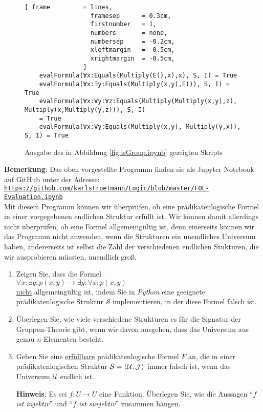 \begin{figure}[!ht]
\centering
\begin{Verbatim}[ frame         = lines, 
                  framesep      = 0.3cm, 
                  firstnumber   = 1,
                  numbers       = none,
                  numbersep     = -0.2cm,
                  xleftmargin   = -0.5cm,
                  xrightmargin  = -0.5cm,
                ]
    evalFormula(∀x:Equals(Multiply(E(),x),x), S, I) = True
    evalFormula(∀x:∃y:Equals(Multiply(x,y),E()), S, I) = True
    evalFormula(∀x:∀y:∀z:Equals(Multiply(Multiply(x,y),z), Multiply(x,Multiply(y,z))), S, I)
    = True
    evalFormula(∀x:∀y:Equals(Multiply(x,y), Multiply(y,x)), S, I) = True
\end{Verbatim}
\vspace*{-0.3cm}
\caption{Ausgabe des in Abbildung \ref{fig:isGroup.ipynb} gezeigten Skripts}
\label{fig:isGroup.out}
\end{figure}

\noindent
\textbf{Bemerkung}:  Das oben vorgestellte Programm finden sie als Jupyter Notebook auf GitHub unter der Adresse:
\\[0.2cm]
\hspace*{0.8cm}
\href{https://github.com/karlstroetmann/Logic/blob/master/Python/FOL-Evaluation.ipynb}{\texttt{https://github.com/karlstroetmann/Logic/blob/master/FOL-Evaluation.ipynb}}
\\[0.2cm]
Mit diesem Programm können wir überprüfen, ob eine
prädikatenlogische Formel in einer vorgegebenen endlichen Struktur erfüllt ist. Wir können damit
allerdings nicht überprüfen, ob eine Formel allgemeingültig ist, denn einerseits können
wir das Programm nicht anwenden, wenn die Strukturen ein unendliches Universum haben,
andererseits ist selbst die Zahl der verschiedenen endlichen Stukturen, die wir ausprobieren
müssten, unendlich groß.  \eox

\exercise
\begin{enumerate}
\item Zeigen Sie, dass die Formel
      \\[0.2cm]
      \hspace*{1.3cm}
      $\forall x: \exists y: p(x,y) \rightarrow \exists y: \forall x: p(x,y)$
      \\[0.2cm]
      \underline{nicht} allgemeingültig ist, indem Sie in \textsl{Python} eine geeignete
      prädikatenlogische Struktur $\mathcal{S}$ implementieren, in der diese Formel falsch ist.
\item Überlegen Sie, wie viele verschiedene Strukturen es für die Signatur der Gruppen-Theorie gibt, wenn wir davon
      ausgehen, dass das Universum aus genau $n$ Elementen besteht.
\item Geben Sie eine \underline{erfüllbare} prädikatenlogische Formel $F$ an, die in einer prädikatenlogischen
      Struktur $\mathcal{S} = \pair(\mathcal{U},\mathcal{J})$ immer falsch ist, wenn das Universum $\mathcal{U}$ endlich ist.

      \textbf{Hinweis}: Es sei $f:U \rightarrow U$ eine Funktion.  Überlegen Sie, wie die Aussagen
      ``\emph{$f$ ist injektiv}'' und ``\emph{$f$ ist surjektiv}'' zusammen hängen.
      \exend  
\end{enumerate}

